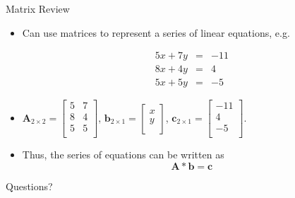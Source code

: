 \documentclass[handout,x11names,unknownkeysallowed]{beamer}
\begin{document}
\begin{frame}
Matrix Review
\begin{itemize}
\item Can use matrices to represent a series of linear equations, e.g.

\begin{eqnarray*}
5x + 7y & = & -11\\
8x + 4y & = & 4 \\
5x+5y & = & -5 
\end{eqnarray*}
													
\item $\bm{A}_{2 \times 2} = \left[ \begin{array}{cc}
													5 & 7 \\
													8 & 4 \\
													5 & 5 \\ 
													\end{array}\right]$, 
			$\bm{b}_{2 \times 1} = \left[ \begin{array}{c}
													x  \\
													y  \\
													\end{array}\right]$, 
			$\bm{c}_{2 \times 1} = \left[ \begin{array}{c}
													-11  \\
													4  \\
													-5  \\ 
													\end{array}\right]$.
\item Thus, the series of equations can be written as
\begin{equation*}
\bm{A} * \bm{b} = \bm{c}
\end{equation*}
\end{itemize}
\end{frame}

\begin{frame}
\begin{center}
Questions?
\end{center}

\end{frame}
\end{document}

